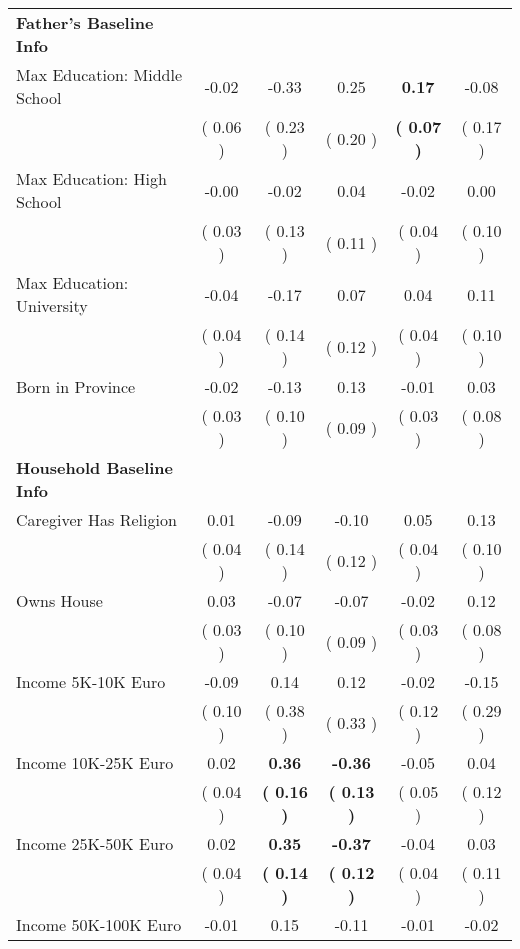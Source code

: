 \begin{table}[H]
{\begin{tabular}{lccccc}
\midrule
\textbf{Father's Baseline Info} \\
\quad Max Education: Middle School &     -0.02 &     -0.33 &      0.25 & \textbf{     0.17} &     -0.08 \\
\quad  & (     0.06 ) & (     0.23 )  & (     0.20 )  & \textbf{(     0.07 )} & (     0.17 ) \\
\quad Max Education: High School &     -0.00 &     -0.02 &      0.04 &     -0.02 &      0.00 \\
\quad  & (     0.03 ) & (     0.13 )  & (     0.11 )  & (     0.04 ) & (     0.10 ) \\
\quad Max Education: University &     -0.04 &     -0.17 &      0.07 &      0.04 &      0.11 \\
\quad  & (     0.04 ) & (     0.14 )  & (     0.12 )  & (     0.04 ) & (     0.10 ) \\
\quad Born in Province &     -0.02 &     -0.13 &      0.13 &     -0.01 &      0.03 \\
\quad  & (     0.03 ) & (     0.10 )  & (     0.09 )  & (     0.03 ) & (     0.08 ) \\
\midrule
\textbf{Household Baseline Info} \\
\quad Caregiver Has Religion &      0.01 &     -0.09 &     -0.10 &      0.05 &      0.13 \\
\quad  & (     0.04 ) & (     0.14 )  & (     0.12 )  & (     0.04 ) & (     0.10 ) \\
\quad Owns House &      0.03 &     -0.07 &     -0.07 &     -0.02 &      0.12 \\
\quad  & (     0.03 ) & (     0.10 )  & (     0.09 )  & (     0.03 ) & (     0.08 ) \\
\quad Income 5K-10K Euro &     -0.09 &      0.14 &      0.12 &     -0.02 &     -0.15 \\
\quad  & (     0.10 ) & (     0.38 )  & (     0.33 )  & (     0.12 ) & (     0.29 ) \\
\quad Income 10K-25K Euro &      0.02 & \textbf{     0.36} & \textbf{    -0.36} &     -0.05 &      0.04 \\
\quad  & (     0.04 ) & \textbf{(     0.16 )}  & \textbf{(     0.13 )}  & (     0.05 ) & (     0.12 ) \\
\quad Income 25K-50K Euro &      0.02 & \textbf{     0.35} & \textbf{    -0.37} &     -0.04 &      0.03 \\
\quad  & (     0.04 ) & \textbf{(     0.14 )}  & \textbf{(     0.12 )}  & (     0.04 ) & (     0.11 ) \\
\quad Income 50K-100K Euro &     -0.01 &      0.15 &     -0.11 &     -0.01 &     -0.02 \\

\end{tabular}}
\end{table}
